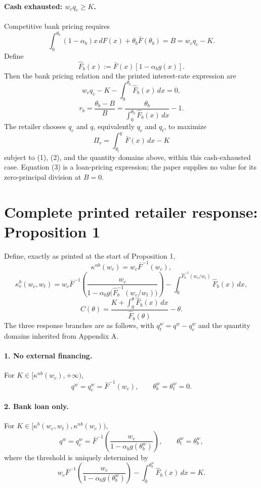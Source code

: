 \documentclass{article}
\begin{document}
\paragraph{Cash exhausted: $w_cq_c\geq K$.}
Competitive bank pricing requires
\[
\int_0^{\theta_b}(1-\alpha_b)x\,dF(x)
 +\theta_b\bar F(\theta_b)=B=w_cq_c-K.
\]
Define
\[
\hat F_b(x):=\bar F(x)[1-\alpha_bg(x)].
\]
Then the bank pricing relation and the printed interest-rate expression are
\begin{equation}
w_cq_c-K-\int_0^{\theta_b}\hat F_b(x)\,dx=0,\tag{2}
\end{equation}
\begin{equation}
r_b=\frac{\theta_b-B}{B}
=\frac{\theta_b}{\displaystyle\int_0^{\theta_b}\hat F_b(x)\,dx}-1.\tag{3}
\end{equation}
The retailer chooses $q_c$ and $q$, equivalently $q_c$ and $q_t$, to maximize
\begin{equation}
\Pi_r=\int_{\theta_t}^{q}\bar F(x)\,dx-K\tag{4}
\end{equation}
subject to (1), (2), and the quantity domains above, within this cash-exhausted case. Equation (3) is a loan-pricing expression; the paper supplies no value for its zero-principal division at $B=0$.

\section*{Complete printed retailer response: Proposition 1}
Define, exactly as printed at the start of Proposition 1,
\[
\kappa^{nb}(w_c)=w_c\bar F^{-1}(w_c),
\]
\[
\kappa_r^b(w_c,w_t)
=w_c\bar F^{-1}\!\left(
\frac{w_c}{1-\alpha_bg\bigl(\hat F_b^{-1}(w_c/w_t)\bigr)}
\right)
-\int_0^{\hat F_b^{-1}(w_c/w_t)}\hat F_b(x)\,dx,
\]
\[
C(\theta)=\frac{K+\displaystyle\int_0^{\theta}\hat F_b(x)\,dx}
{\hat F_b(\theta)}-\theta.
\]
The three response branches are as follows, with $q_t^w=q^w-q_c^w$ and the quantity domains inherited from Appendix A.

\paragraph{1. No external financing.}
For $K\in[\kappa^{nb}(w_c),+\infty)$,
\[
q^w=q_c^w=\bar F^{-1}(w_c),\qquad
\theta_b^w=\theta_t^w=0.
\]

\paragraph{2. Bank loan only.}
For $K\in[\kappa^b(w_c,w_t),\kappa^{nb}(w_c))$,
\[
q^w=q_c^w=\bar F^{-1}\!\left(
\frac{w_c}{1-\alpha_bg(\theta_b^w)}\right),
\qquad \theta_t^w=\theta_b^w,
\]
where the threshold is uniquely determined by
\begin{equation}
w_c\bar F^{-1}\!\left(\frac{w_c}{1-\alpha_bg(\theta_b^w)}\right)
-\int_0^{\theta_b^w}\hat F_b(x)\,dx=K.\tag{5}
\end{equation}
\end{document}

